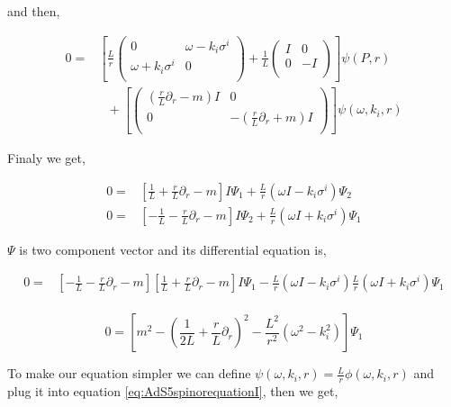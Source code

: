 and then,

\begin{align} \label{eq:AdS5spinorequationI}
   0 =& \left[ \frac{L}{r} \begin{pmatrix} 0 & \omega - k_i\sigma^i \\ \omega + k_i\sigma^i & 0 \\ \end{pmatrix} + \frac{1}{L}\begin{pmatrix} I & 0 \\ 0 & -I \\ \end{pmatrix} \right] \psi(P,r)\nonumber\\
      & ~~~ + \left[ \begin{pmatrix} (\frac{r}{L}\partial_r-m)I & 0 \\ 0 & -(\frac{r}{L}\partial_r+m)I \\ \end{pmatrix}  \right] \psi(\omega,k_i,r)
\end{align}

Finaly we get,

\begin{align}
   0 =& \left[ \frac{1}{L} + \frac{r}{L}\partial_r - m \right]I\Psi_1 + \frac{L}{r}(\omega I-k_i\sigma^i)\Psi_2 \nonumber\\
   0 =& \left[-\frac{1}{L} - \frac{r}{L}\partial_r - m \right]I\Psi_2 + \frac{L}{r}(\omega I+k_i\sigma^i)\Psi_1
\end{align}

$\Psi$ is two component vector and its differential equation is,

\begin{align}
   0 =& \left[-\frac{1}{L} - \frac{r}{L}\partial_r - m \right]\left[ \frac{1}{L} + \frac{r}{L}\partial_r - m \right]I\Psi_1 - \frac{L}{r}(\omega I - k_i\sigma^i)\frac{L}{r}(\omega I + k_i\sigma^i)\Psi_1 \nonumber\\
\end{align}

\begin{equation}
   0 = \left[ m^2 - \left(\frac{1}{2L} + \frac{r}{L}\partial_r \right)^2 - \frac{L^2}{r^2}\left(\omega^2 - k_i^2 \right) \right]\Psi_1
\end{equation}

To make our equation simpler we can define $\psi(\omega,k_i,r) = \frac{L}{r}\phi(\omega,k_i,r)$ and plug it into equation \ref{eq:AdS5spinorequationI}, then we get,

